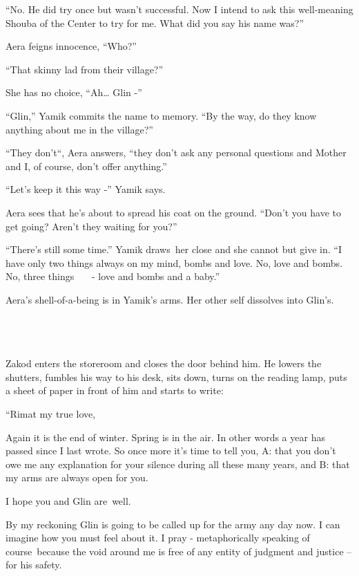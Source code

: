 \documentclass[twoside,11pt]{book}
\begin{document}
{}``No. He did try once but wasn't successful. Now I intend to ask this well-meaning Shouba of the Center to try for me.
What did you say his name was?''

Aera feigns innocence, ``Who?''~

{}``That skinny lad from their village?''

She has no choice, ``Ah{\dots} Glin -''

{}``Glin,'' Yamik commits the name to memory. ``By the way, do they know anything about me in the
village?''

``They don't``, Aera answers, ``they don't ask any personal questions and Mother
and I, of course, don't offer anything.''

``Let's keep it this way -'' Yamik says.

Aera sees that he's about to spread his coat on the ground. ``Don't you have to get going? Aren't they waiting for
you?''

{}``There's still some time.'' Yamik draws~her close and she cannot but give in. ``I have only two things always on my
mind, bombs and love. No, love and bombs. No, three things \ \ \ {}- love and bombs and a baby.''

Aera's shell-of-a-being is in Yamik's arms.{ }Her other self dissolves into Glin's.

~

\chapter{}

Zakod enters the storeroom and closes the door behind him. He lowers the shutters, fumbles his way to his desk, sits
down, turns on the reading lamp, puts a sheet of paper in front of him and starts to write:

{}``Rimat my true love,

Again it is the end of winter. Spring is in the air. In other words a year has passed since I last wrote. So once more
it's time to tell you, A: that you don't owe me any explanation for your silence during all these many years, and B:
that my arms are always open for you.

I hope you and Glin are~well.

By my reckoning Glin is going to be called up for the army any day now. I can imagine how you must feel about it. I pray
- metaphorically speaking of course~because the void around me is free of any entity of judgment and justice -- for his
safety.
\end{document}
